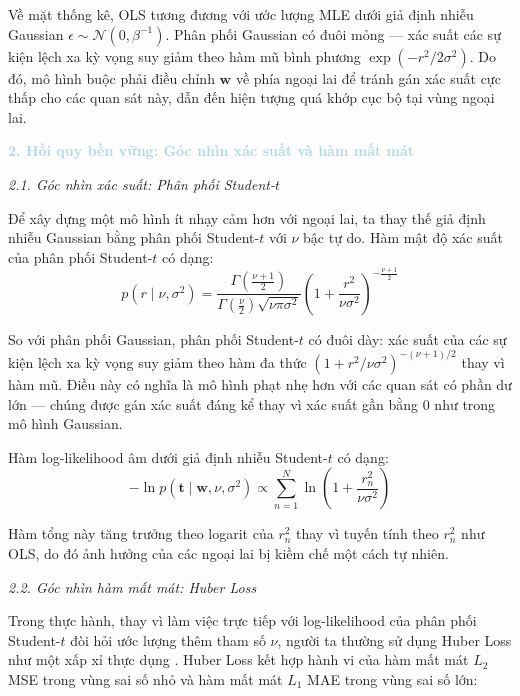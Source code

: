 Về mặt thống kê, OLS tương đương với ước lượng MLE dưới giả định nhiễu Gaussian 
$\epsilon \sim \mathcal{N}(0, \beta^{-1})$. Phân phối Gaussian có đuôi 
mỏng --- xác suất các sự kiện lệch xa kỳ vọng suy giảm theo hàm 
mũ bình phương $\exp(-r^2/2\sigma^2)$. Do đó, mô hình buộc phải điều chỉnh 
$\boldsymbol{w}$ về phía ngoại lai để tránh gán xác suất cực thấp cho các quan 
sát này, dẫn đến hiện tượng quá khớp cục bộ tại vùng ngoại 
lai.

\noindent\textcolor{lightblue}{\textbf{2. Hồi quy bền vững: Góc nhìn xác suất và hàm mất mát}}

\noindent\textcolor{infocolor}{\textit{2.1. Góc nhìn xác suất: Phân phối Student-$t$}}

Để xây dựng một mô hình ít nhạy cảm hơn với ngoại lai, ta thay thế giả định 
nhiễu Gaussian bằng phân phối Student-$t$ với $\nu$ bậc tự do. Hàm mật độ xác suất của phân phối Student-$t$ có dạng:
$$p(r \mid \nu, \sigma^2) 
  = \frac{\Gamma\!\left(\frac{\nu+1}{2}\right)}{\Gamma\!\left(\frac{\nu}{2}\right) 
    \sqrt{\nu\pi\sigma^2}} 
    \left(1 + \frac{r^2}{\nu\sigma^2}\right)^{-\frac{\nu+1}{2}}$$

So với phân phối Gaussian, phân phối Student-$t$ có đuôi dày: xác suất của các sự kiện lệch xa kỳ vọng suy giảm theo hàm đa thức 
$(1 + r^2/\nu\sigma^2)^{-(\nu+1)/2}$ thay vì hàm mũ. Điều này có nghĩa là 
mô hình phạt nhẹ hơn với các quan sát có phần dư lớn --- chúng được 
gán xác suất đáng kể thay vì xác suất gần bằng 0 như trong mô hình Gaussian.

Hàm log-likelihood âm dưới giả định nhiễu Student-$t$ 
có dạng:
$$-\ln p(\boldsymbol{t} \mid \boldsymbol{w}, \nu, \sigma^2) 
  \propto \sum_{n=1}^{N} \ln\!\left(1 + \frac{r_n^2}{\nu\sigma^2}\right)$$

Hàm tổng này tăng trưởng theo logarit của $r_n^2$ thay vì tuyến tính theo 
$r_n^2$ như OLS, do đó ảnh hưởng của các ngoại lai bị kiềm chế một cách tự 
nhiên.

\noindent\textcolor{infocolor}{\textit{2.2. Góc nhìn hàm mất mát: Huber Loss}}

Trong thực hành, thay vì làm việc trực tiếp với log-likelihood của phân phối 
Student-$t$ đòi hỏi ước lượng thêm tham số $\nu$, người ta thường sử dụng 
Huber Loss như một xấp xỉ thực dụng \cite{bishop2006pattern}. 
Huber Loss kết hợp hành vi của hàm mất mát $L_2$ MSE trong vùng sai số nhỏ 
và hàm mất mát $L_1$ MAE trong vùng sai số lớn:

